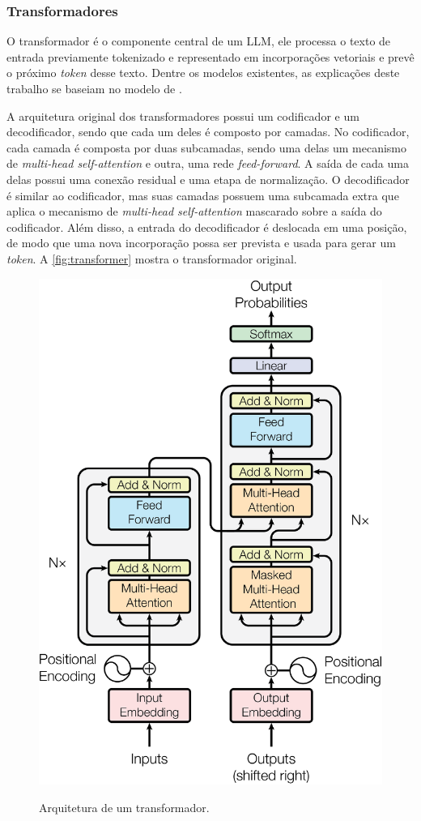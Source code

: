 \subsubsection{Transformadores} \label{sec:transformers}

O transformador é o componente central de um \ac{LLM}, ele processa o texto de entrada previamente tokenizado e representado em incorporações vetoriais e prevê o
próximo \textit{token} desse texto. Dentre os modelos existentes, as explicações deste trabalho se baseiam no modelo de \textcite{transformer}.

A arquitetura original dos transformadores possui um codificador e um decodificador, sendo que cada um deles é composto por camadas. No codificador, cada camada é
composta por duas subcamadas, sendo uma delas um mecanismo de \textit{multi-head self-attention} e outra, uma rede \textit{feed-forward}. A saída de cada uma delas possui
uma conexão residual e uma etapa de normalização. O decodificador é similar ao codificador, mas suas camadas possuem uma subcamada extra que aplica o mecanismo de
\textit{multi-head self-attention} mascarado sobre a saída do codificador. Além disso, a entrada do decodificador é deslocada em uma posição, de modo que uma nova
incorporação possa ser prevista e usada para gerar um \textit{token}. A \autoref{fig:transformer} mostra o transformador original.

\begin{figure}[ht]
      \centering
      \caption{\small Arquitetura de um transformador.}
      \includegraphics[width=0.4\columnwidth,keepaspectratio]{images/transformer.png}
      \label{fig:transformer}
\end{figure}

